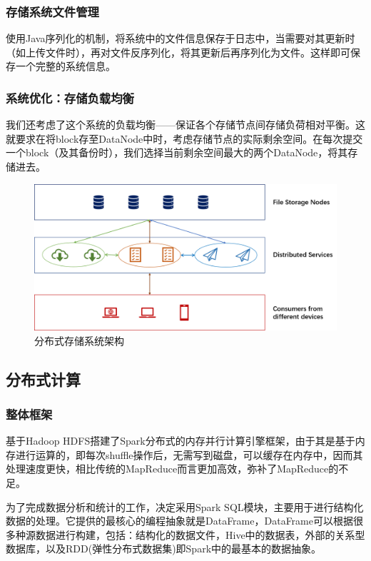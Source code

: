 \documentclass[12pt,a4paper]{article}
\begin{document}
\subsubsection{存储系统文件管理}
使用Java序列化的机制，将系统中的文件信息保存于日志中，当需要对其更新时（如上传文件时），再对文件反序列化，将其更新后再序列化为文件。这样即可保存一个完整的系统信息。
\subsubsection{系统优化：存储负载均衡}
我们还考虑了这个系统的负载均衡——保证各个存储节点间存储负荷相对平衡。这就要求在将block存至DataNode中时，考虑存储节点的实际剩余空间。在每次提交一个block（及其备份时），我们选择当前剩余空间最大的两个DataNode，将其存储进去。


\begin{figure}[htb]
\centering
\includegraphics[width=14cm]{storage_architecture}
\caption{分布式存储系统架构 \label{storage_architecture}}
\end{figure}

\clearpage

\subsection{分布式计算}
\subsubsection{整体框架}
基于Hadoop HDFS搭建了Spark分布式的内存并行计算引擎框架，由于其是基于内存进行运算的，即每次shuffle操作后，无需写到磁盘，可以缓存在内存中，因而其处理速度更快，相比传统的MapReduce而言更加高效，弥补了MapReduce的不足。

为了完成数据分析和统计的工作，决定采用Spark SQL模块，主要用于进行结构化数据的处理。它提供的最核心的编程抽象就是DataFrame，DataFrame可以根据很多种源数据进行构建，包括：结构化的数据文件，Hive中的数据表，外部的关系型数据库，以及RDD(弹性分布式数据集)即Spark中的最基本的数据抽象。
\end{document}
